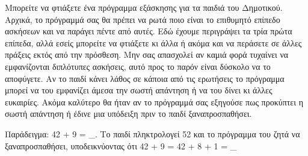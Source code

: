 \documentclass[a4paper,11pt,oneside]{book}
\begin{document}
{{{\begin{exercise}
Μπορείτε να φτιάξετε ένα πρόγραμμα εξάσκησης για τα παιδιά του Δημοτικού. Αρχικά, το πρόγραμμά σας θα πρέπει να ρωτά ποιο είναι το επιθυμητό επίπεδο ασκήσεων και να παράγει πέντε από αυτές. Εδώ έχουμε περιγράψει τα τρία πρώτα επίπεδα, αλλά εσείς μπορείτε να φτιάξετε κι άλλα ή ακόμα και να περάσετε σε άλλες πράξεις εκτός από την πρόσθεση. Μην σας απασχολεί αν καμιά φορά τυχαίνει να εμφανίζονται διπλότυπες ασκήσεις, αυτό προς το παρόν είναι δύσκολο να το αποφύγετε. Αν το παιδί κάνει λάθος σε κάποια από τις ερωτήσεις το πρόγραμμα μπορεί να του εμφανίζει άμεσα την σωστή απάντηση ή να του δίνει κι άλλες ευκαιρίες. Ακόμα καλύτερο θα ήταν αν το πρόγραμμά σας εξηγούσε πως προκύπτει η σωστή απάντηση ή έδινε μια υπόδειξη πριν το παιδί ξαναπροσπαθήσει.

\begin{note}
Παράδειγμα: 42 + 9 = \_. Το παιδί πληκτρολογεί 52 και το πρόγραμμα του ζητά να ξαναπροσπαθήσει, υποδεικνύοντας ότι 42 + 9 = 42 + 8 + 1 = \_
\end{note}
\end{exercise}


\section*{}
\vspace{4\parskip}
\hrulefill

}}}
\end{document}

